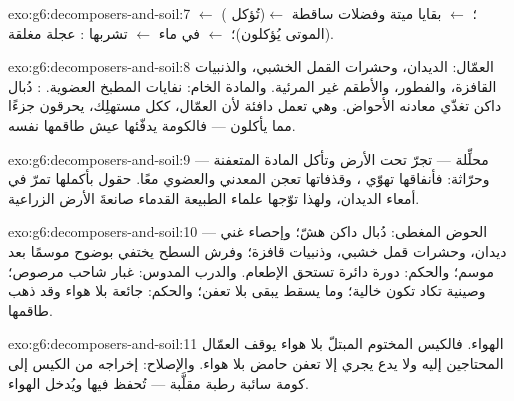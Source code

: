 \begin{solution}{exo:g6:decomposers-and-soil:7}
 $\leftarrow$  ( تُؤكل)؛ 
 $\leftarrow$ بقايا ميتة وفضلات  ساقطة
$\leftarrow$  (الموتى يُؤكلون)؛ 
$\leftarrow$  في ماء 
$\leftarrow$ تشربها : عجلة مغلقة.
\end{solution}

\begin{solution}{exo:g6:decomposers-and-soil:8}
العمّال: الديدان، وحشرات القمل الخشبي، والذنبيات القافزة،
والفطور، والأطقم غير المرئية. والمادة الخام: نفايات المطبخ
العضوية. : دُبال داكن تغذّي معادنه الأحواض. وهي تعمل دافئة
لأن العمّال، ككل مستهلِك، يحرقون جزءًا مما يأكلون --- فالكومة
يدفّئها عيش طاقمها نفسه.
\end{solution}

\begin{solution}{exo:g6:decomposers-and-soil:9}
محلِّلة --- تجرّ  تحت الأرض وتأكل المادة المتعفنة ---
وحرّاثة: فأنفاقها تهوّي ، وقذفاتها تعجن المعدني والعضوي
معًا.  حقول بأكملها تمرّ في أمعاء الديدان، ولهذا توّجها علماء
الطبيعة القدماء صانعةَ الأرض الزراعية.
\end{solution}

\begin{solution}{exo:g6:decomposers-and-soil:10}
الحوض المغطى: دُبال داكن هشّ؛ وإحصاء غني --- ديدان، وحشرات قمل
خشبي، وذنبيات قافزة؛ وفرش السطح يختفي بوضوح موسمًا بعد موسم؛
والحكم: دورة دائرة تستحق الإطعام. والدرب المدوس: غبار شاحب مرصوص؛
وصينية تكاد تكون خالية؛ وما يسقط يبقى بلا تعفن؛ والحكم: 
جائعة بلا هواء وقد ذهب طاقمها.
\end{solution}

\begin{solution}{exo:g6:decomposers-and-soil:11}
الهواء. فالكيس المختوم المبتلّ بلا هواء يوقف العمّال المحتاجين
إليه ولا يدع يجري إلا تعفن حامض بلا هواء. والإصلاح: إخراجه من
الكيس إلى كومة سائبة رطبة مقلَّبة --- تُحفظ فيها  ويُدخل
الهواء.
\end{solution}


